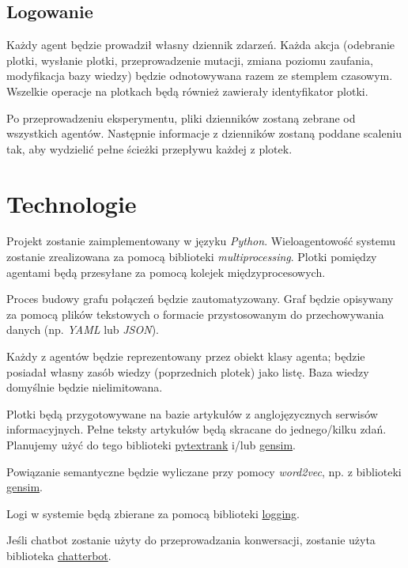 \documentclass{article}
\begin{document}
	\subsection{Logowanie}
	Każdy agent będzie prowadził własny dziennik zdarzeń. Każda akcja (odebranie plotki, wysłanie plotki, przeprowadzenie mutacji, zmiana poziomu zaufania, modyfikacja bazy wiedzy) będzie odnotowywana razem ze stemplem czasowym. Wszelkie operacje na plotkach będą również zawierały identyfikator plotki.
	
	Po przeprowadzeniu eksperymentu, pliki dzienników zostaną zebrane od wszystkich agentów. Następnie informacje z dzienników zostaną poddane scaleniu tak, aby wydzielić pełne ścieżki przepływu każdej z plotek.
	\section{Technologie}
	Projekt zostanie zaimplementowany w języku \textit{Python}. Wieloagentowość systemu zostanie zrealizowana za pomocą biblioteki \textit{multiprocessing}. Plotki pomiędzy agentami będą przesyłane za pomocą kolejek międzyprocesowych.
	
	Proces budowy grafu połączeń będzie zautomatyzowany. Graf będzie opisywany za pomocą plików tekstowych o formacie przystosowanym do przechowywania danych (np. \textit{YAML} lub \textit{JSON}).
	
	Każdy z agentów będzie reprezentowany przez obiekt klasy agenta; będzie posiadał własny zasób wiedzy (poprzednich plotek) jako listę. Baza wiedzy domyślnie będzie nielimitowana.
	
	Plotki będą przygotowywane na bazie artykułów z anglojęzycznych serwisów informacyjnych. Pełne teksty artykułów będą skracane do jednego/kilku zdań. Planujemy użyć do tego biblioteki \href{https://github.com/DerwenAI/pytextrank}{pytextrank} i/lub \href{https://pypi.org/project/gensim/}{gensim}.
	
	Powiązanie semantyczne będzie wyliczane przy pomocy \textit{word2vec}, np. z biblioteki \href{https://pypi.org/project/gensim/}{gensim}.
	
	Logi w systemie będą zbierane za pomocą biblioteki \href{https://docs.python.org/3/library/logging.html#module-logging}{logging}.
	
	Jeśli chatbot zostanie użyty do przeprowadzania konwersacji, zostanie użyta biblioteka \href{https://chatterbot.readthedocs.io/en/stable/}{chatterbot}.
	
\end{document}
